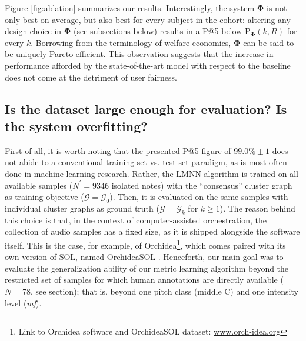 \documentclass{bmcart}
\newcommand{\lnameref}[1]{%
\bgroup
\let\nmu\MakeLowercase
\nameref{#1}\egroup}
\newcommand{\nmu}{}
\begin{document}
Figure \ref{fig:ablation} summarizes our results.
Interestingly, the system $\boldsymbol{\Phi}$ is not only best on average, but also best for every subject in the cohort: altering any design choice in $\boldsymbol{\Phi}$ (see subsections below) results in a P@5 below $\mathrm{P}_{\mathbf{\Phi}}(k, R)$ for every $k$.
Borrowing from the terminology of welfare economics, $\boldsymbol{\Phi}$ can be said to be uniquely Pareto-efficient.
This observation suggests that the increase in performance afforded by the state-of-the-art model with respect to the baseline does not come at the detriment of user fairness.


\subsection*{Is the dataset large enough for evaluation? Is the system overfitting?}
First of all, it is worth noting that the presented P@5 figure of $99.0\% \pm 1$ does not abide to a conventional training set vs. test set paradigm, as is most often done in machine learning research.
Rather, the LMNN algorithm is trained on all available samples ($N^{\prime}=9346$ isolated notes) with the ``consensus'' cluster graph as training objective ($\mathcal{G}=\mathcal{G}_0$).
Then, it is evaluated on the same samples with individual cluster graphs as ground truth ($\mathcal{G}=\mathcal{G}_k$ for $k\geq1$).
The reason behind this choice is that, in the context of computer-assisted orchestration, the collection of audio samples has a fixed size, as it is shipped alongside the software itself.
This is the case, for example, of Orchidea\footnote{Link to Orchidea software and OrchideaSOL dataset: \url{www.orch-idea.org}}, which comes paired with its own version of SOL, named OrchideaSOL \cite{cella2020icmc}.
Henceforth, our main goal was to evaluate the generalization ability of our metric learning algorithm beyond the restricted set of samples for which human annotations are directly available ($N=78$, see \lnameref{sec:data-collection} section); that is, beyond one pitch class (middle C) and one intensity level (\emph{mf}).
\end{document}
